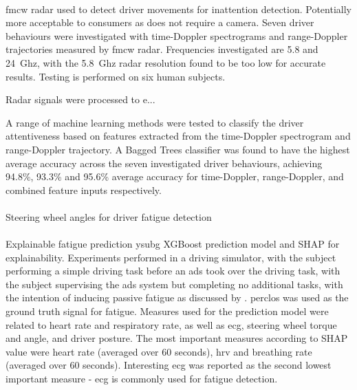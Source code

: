 \documentclass[11pt, parskip=half*,twoside=false]{scrbook}
\begin{document}
\paragraph{\citet{dingInattentiveDrivingBehavior2019}} \gls{fmcw} radar used to detect driver movements for inattention detection. Potentially more acceptable to consumers as does not require a camera. Seven driver behaviours were investigated with time-Doppler spectrograms and range-Doppler trajectories measured by \gls{fmcw} radar. Frequencies investigated are 5.8 and 24~Ghz, with the 5.8~Ghz radar resolution found to be too low for accurate results. Testing is performed on six human subjects.

Radar signals were processed to e...

A range of machine learning methods were tested to classify the driver attentiveness based on features extracted from the time-Doppler spectrogram and range-Doppler trajectory. A Bagged Trees classifier was found to have the highest average accuracy across the seven investigated driver behaviours, achieving 94.8\%, 93.3\% and 95.6\% average accuracy for time-Doppler, range-Doppler, and combined feature inputs respectively. 
 
\paragraph{\citet{liOnlineDetectionDriver2017}} Steering wheel angles for driver fatigue detection 

\paragraph{\citet{zhouPredictingDriverFatigue2021}} Explainable fatigue prediction ysubg XGBoost prediction model and SHAP for explainability.  Experiments performed in a driving simulator, with the subject performing a simple driving task before an \gls{ads} took over the driving task, with the subject supervising the \gls{ads} system but completing no additional tasks, with the intention of inducing passive fatigue as discussed by \citep{goncalvesDrowsinessConditionalAutomation2016}. \gls{perclos} was used as the ground truth signal for fatigue. Measures used for the prediction model were related to heart rate and respiratory rate, as well as \gls{ecg}, steering wheel torque and angle, and driver posture. The most important measures according to SHAP value were heart rate (averaged over 60 seconds), \gls{hrv} and breathing rate (averaged over 60 seconds). Interesting \gls{ecg} was reported as the second lowest important measure - \gls{ecg} is commonly used for fatigue detection.  
	
\end{document}
